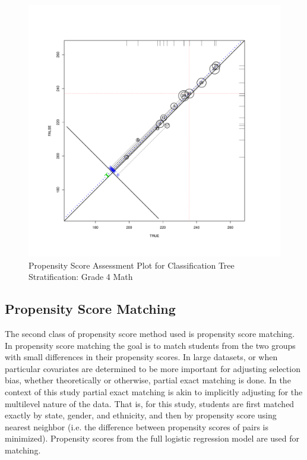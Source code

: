 \documentclass[letterpaper,12p,twoside]{article} %
\begin{document}
\begin{figure}[t]
\begin{center}
\includegraphics[width=\textwidth]{../Figures2009/g4math-circpsa-tree.pdf}
\caption{Propensity Score Assessment Plot for Classification Tree Stratification: Grade 4 Math}
\label{fig:g4math:circpsa:tree}
\end{center}
\end{figure}

\clearpage





\subsection{Propensity Score Matching}

The second class of propensity score method used is propensity score matching. In propensity score matching the goal is to match students from the two groups with small differences in their propensity scores. In large datasets, or when particular covariates are determined to be more important for adjusting selection bias, whether theoretically or otherwise, partial exact matching is done. In the context of this study partial exact matching is akin to implicitly adjusting for the multilevel nature of the data. That is, for this study, students are first matched exactly by state, gender, and ethnicity, and then by propensity score using nearest neighbor (i.e. the difference between propensity scores of pairs is minimized). Propensity scores from the full logistic regression model are used for matching.
\end{document}
